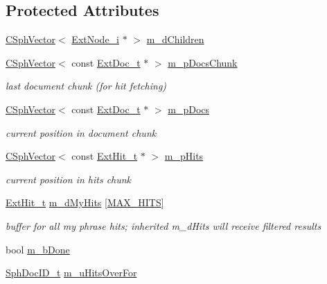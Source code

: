 \subsection*{Protected Attributes}
\begin{DoxyCompactItemize}
\item 
\hyperlink{classCSphVector}{C\-Sph\-Vector}$<$ \hyperlink{classExtNode__i}{Ext\-Node\-\_\-i} $\ast$ $>$ \hyperlink{classExtOrder__c_a773002ab4950304bc50961559fc0faa5}{m\-\_\-d\-Children}
\item 
\hyperlink{classCSphVector}{C\-Sph\-Vector}$<$ const \hyperlink{structExtDoc__t}{Ext\-Doc\-\_\-t} $\ast$ $>$ \hyperlink{classExtOrder__c_a1cc05abe8ceafbaeae482dee243a2a4c}{m\-\_\-p\-Docs\-Chunk}
\begin{DoxyCompactList}\small\item\em last document chunk (for hit fetching) \end{DoxyCompactList}\item 
\hyperlink{classCSphVector}{C\-Sph\-Vector}$<$ const \hyperlink{structExtDoc__t}{Ext\-Doc\-\_\-t} $\ast$ $>$ \hyperlink{classExtOrder__c_a22d81dbd92328c2e70bd7ee9d8da4444}{m\-\_\-p\-Docs}
\begin{DoxyCompactList}\small\item\em current position in document chunk \end{DoxyCompactList}\item 
\hyperlink{classCSphVector}{C\-Sph\-Vector}$<$ const \hyperlink{structExtHit__t}{Ext\-Hit\-\_\-t} $\ast$ $>$ \hyperlink{classExtOrder__c_ae73b6cbef01083be1b9ddb418f3c7500}{m\-\_\-p\-Hits}
\begin{DoxyCompactList}\small\item\em current position in hits chunk \end{DoxyCompactList}\item 
\hyperlink{structExtHit__t}{Ext\-Hit\-\_\-t} \hyperlink{classExtOrder__c_a4073b2991e5f2f0bc16ada6495aaf05d}{m\-\_\-d\-My\-Hits} \mbox{[}\hyperlink{classExtNode__i_a79b81cba51253fdbe56fd3595fac9ab4}{M\-A\-X\-\_\-\-H\-I\-T\-S}\mbox{]}
\begin{DoxyCompactList}\small\item\em buffer for all my phrase hits; inherited m\-\_\-d\-Hits will receive filtered results \end{DoxyCompactList}\item 
bool \hyperlink{classExtOrder__c_a89b86c70787618a25cdaf7ee7959a546}{m\-\_\-b\-Done}
\item 
\hyperlink{sphinx_8h_a3176771631c12a9e4897272003e6b447}{Sph\-Doc\-I\-D\-\_\-t} \hyperlink{classExtOrder__c_ad76731b2aab874bdd3d5c5cf96ddc86c}{m\-\_\-u\-Hits\-Over\-For}
\end{DoxyCompactItemize}
